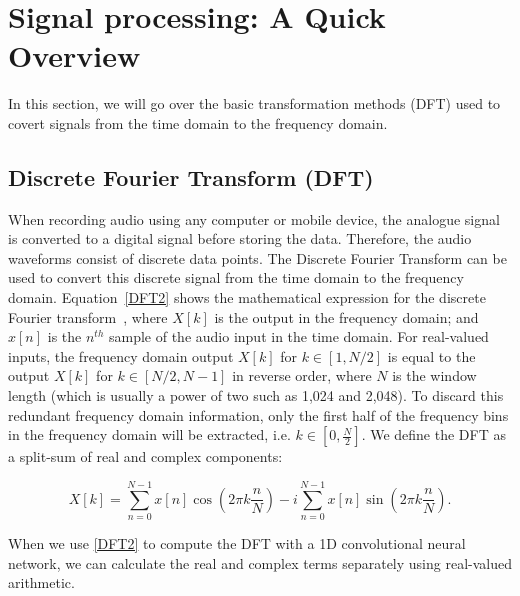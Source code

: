 \documentclass{ieeeaccess}
\begin{document}
\section{Signal processing: A Quick Overview}
In this section, we will go over the basic transformation methods (DFT) used to covert signals from the time domain to the frequency domain. 

\subsection{Discrete Fourier Transform (DFT)} \label{chap:DFT}
When recording audio using any computer or mobile device, the analogue signal is converted to a digital signal before storing the data. Therefore, the audio waveforms consist of discrete data points. The Discrete Fourier Transform can be used to convert this discrete signal from the time domain to the frequency domain. Equation~\eqref{DFT2} shows the mathematical expression for the discrete Fourier transform~\cite{wang1984fast}, where $X[k]$ is the output in the frequency domain; and $x[n]$ is the $n^{th}$ sample of the audio input in the time domain. For real-valued inputs, the frequency domain output $X[k]$ for $k \in [1,N/2]$ is equal to the output $X[k]$ for $k \in [N/2,N-1]$ in reverse order, where $N$ is the window length (which is usually a power of two such as 1,024 and 2,048). To discard this redundant frequency domain information, only the first half of the frequency bins in the frequency domain will be extracted, i.e. $k \in [0,\frac{N}{2}]$. We define the DFT as a split-sum of real and complex components:



\begin{equation} 
X[k] = \sum_{n=0}^{N-1}x[n] \cos(2\pi k \frac{n}{N}) - i \sum_{n=0}^{N-1}x[n]\sin(2\pi k \frac{n}{N})
\label{DFT2}.
\end{equation}


When we use \eqref{DFT2} to compute the DFT with a 1D convolutional neural network, we can calculate the real and complex terms separately using real-valued arithmetic.
\end{document}
